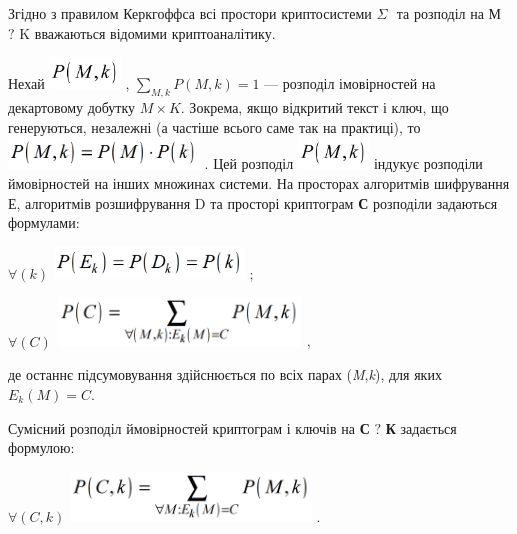  Згідно з правилом Керкгоффса  всі простори криптосистеми   $\Sigma $ $ $ та
розподіл на  М $?$ K  вважаються відомими криптоаналітику.


\bigskip

Нехай 
\includegraphics[width=0.7437in,height=0.3339in]{crypt-img/crypt-img13.png} , 
$\underset{M,k}{\sum }{P(M,k)=1}$  --- розподіл імовірностей на декартовому
добутку  $M\times K$. Зокрема, якщо відкритий текст і ключ, що генеруються,
незалежні (а частіше всього саме так на практиці), то 
\includegraphics[width=1.9992in,height=0.3346in]{crypt-img/crypt-img14.png} .
Цей розподіл 
\includegraphics[width=0.7437in,height=0.3339in]{crypt-img/crypt-img15.png}  
індукує розподіли ймовірностей на інших множинах системи.  На просторах
алгоритмів шифрування Е, алгоритмів розшифрування  D та просторі  криптограм 
\textbf{С}  розподіли задаються формулами:

{\centering
 $\forall (k)$  
\includegraphics[width=1.9898in,height=0.3335in]{crypt-img/crypt-img16.png} ;
\par}

{\centering
 $\forall (C)$   
\includegraphics[width=2.5583in,height=0.5154in]{crypt-img/crypt-img17.png} ,
\par}

де останнє підсумовування здійснюється по всіх парах
(\textit{M},\textit{k}),\textit{ }для яких  $E_k(M)=C$.

Сумісний розподіл ймовірностей  криптограм і ключів  на \textbf{С} $?$
\textbf{К} задається формулою:

{\centering
 $\forall (C,k)$    
\includegraphics[width=2.5201in,height=0.5209in]{crypt-img/crypt-img18.png} .
\par}

